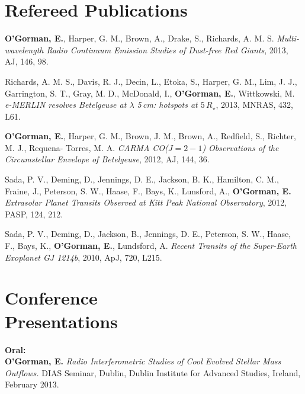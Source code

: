 \documentclass[margin,line]{resume}
\begin{document}
\begin{resume}
    \section{\mysidestyle Refereed Publications}

    \textbf{O'Gorman, E.}, Harper, G. M., Brown, A., Drake, S., Richards, A. M. S.
    \textsl{Multi-wavelength Radio Continuum Emission Studies of Dust-free Red Giants},
    2013, AJ, 146, 98.

\vspace{0mm}
    Richards, A. M. S., Davis, R. J., Decin, L., Etoka, S., Harper, G. M., Lim, J. J., Garrington, S. T., Gray, 	M. D., McDonald, I., \textbf{O'Gorman, E.}, Wittkowski, M.
    \textsl{e-MERLIN resolves Betelgeuse at $\lambda$ 5\,cm: hotspots at $5\,R_{\star}$},
    2013, MNRAS, 432, L61.

\vspace{0mm}
	\textbf{O'Gorman, E.}, Harper, G. M., Brown, J. M., Brown, A., Redfield, S., Richter, M. J., Requena-			Torres, M. A.
    \textsl{CARMA CO($J = 2-1$) Observations of the Circumstellar Envelope of Betelgeuse},
    2012, AJ, 144, 36.

\vspace{0mm}
	Sada, P. V., Deming, D., Jennings, D. E., Jackson, B. K., Hamilton, C. M., Fraine, J., Peterson, S. W., 		Haase, F., Bays, K., Lunsford, A., \textbf{O'Gorman, E.}
    \textsl{Extrasolar Planet Transits Observed at Kitt Peak National Observatory},
    2012, PASP, 124, 212.

\vspace{0mm}
	Sada, P. V., Deming, D., Jackson, B., Jennings, D. E., Peterson, S. W., Haase, F., Bays, K., \textbf{O'Gorman, E.}, Lundsford, A.
    \textsl{Recent Transits of the Super-Earth Exoplanet GJ 1214b},
    2010, ApJ, 720, L215.



    \vspace{2mm}
    \section{\mysidestyle Conference\\Presentations}

    \textbf{Oral:} \vspace{2mm}\\\vspace{1mm}%
\textbf{O'Gorman, E.} \textit{Radio Interferometric Studies of Cool Evolved Stellar Mass Outflows.}
DIAS Seminar, Dublin, Dublin Institute for Advanced Studies, Ireland, February 2013. %
    

\end{resume}
\end{document}
